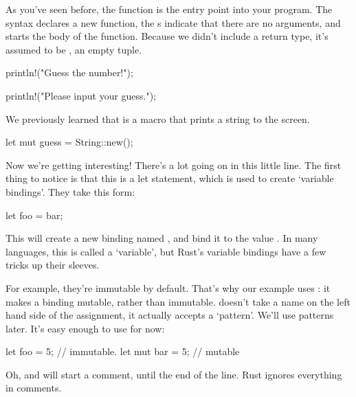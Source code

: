 \begin{rustc}
fn main() {
\end{rustc}

As you’ve seen before, the  function is the entry point into your program. The  syntax declares a new 
function, the \code{()}s indicate that there are no arguments, and \code{\{} starts the body of the function. Because we 
didn’t include a return type, it’s assumed to be \code{()}, an empty tuple.

\begin{rustc}
    println!("Guess the number!");

    println!("Please input your guess.");
\end{rustc}

We previously learned that  is a macro that prints a string to the screen.

\begin{rustc}
    let mut guess = String::new();
\end{rustc}

Now we’re getting interesting! There’s a lot going on in this little line. The first thing to notice is that this is a 
let statement, which is used to create ‘variable bindings’. They take this form:

\begin{rustc}
let foo = bar;
\end{rustc}

This will create a new binding named , and bind it to the value . In many languages, this is called a 
‘variable’, but Rust’s variable bindings have a few tricks up their sleeves.

\blank

For example, they’re immutable by default. That’s why our example uses : it makes a binding mutable, rather than 
immutable.  doesn’t take a name on the left hand side of the assignment, it actually accepts a ‘pattern’. We’ll 
use patterns later. It’s easy enough to use for now:

\begin{rustc}
let foo = 5; // immutable.
let mut bar = 5; // mutable
\end{rustc}

Oh, and \code{//} will start a comment, until the end of the line. Rust ignores everything in comments.

